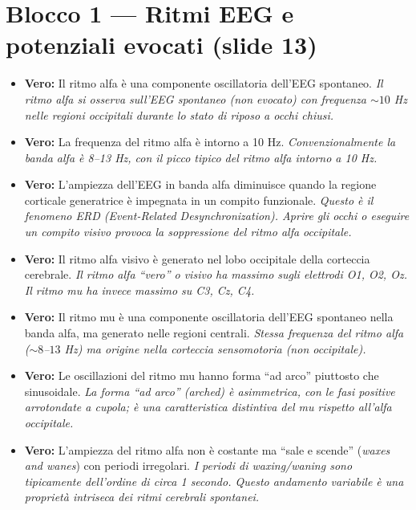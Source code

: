 \section{Blocco 1 — Ritmi EEG e potenziali evocati (slide 13)}

\begin{itemize}
    \item \textbf{Vero:} Il ritmo alfa è una componente oscillatoria dell'EEG spontaneo.
    \textit{Il ritmo alfa si osserva sull'EEG spontaneo (non evocato) con frequenza $\sim 10$ Hz nelle regioni occipitali durante lo stato di riposo a occhi chiusi.}
    
    \item \textbf{Vero:} La frequenza del ritmo alfa è intorno a 10 Hz.
    \textit{Convenzionalmente la banda alfa è 8--13 Hz, con il picco tipico del ritmo alfa intorno a 10 Hz.}
    
    \item \textbf{Vero:} L'ampiezza dell'EEG in banda alfa diminuisce quando la regione corticale generatrice è impegnata in un compito funzionale.
    \textit{Questo è il fenomeno ERD (Event-Related Desynchronization). Aprire gli occhi o eseguire un compito visivo provoca la soppressione del ritmo alfa occipitale.}
    
    \item \textbf{Vero:} Il ritmo alfa visivo è generato nel lobo occipitale della corteccia cerebrale.
    \textit{Il ritmo alfa ``vero'' o visivo ha massimo sugli elettrodi O1, O2, Oz. Il ritmo mu ha invece massimo su C3, Cz, C4.}
    
    \item \textbf{Vero:} Il ritmo mu è una componente oscillatoria dell'EEG spontaneo nella banda alfa, ma generato nelle regioni centrali.
    \textit{Stessa frequenza del ritmo alfa ($\sim 8$--$13$ Hz) ma origine nella corteccia sensomotoria (non occipitale).}
    
    \item \textbf{Vero:} Le oscillazioni del ritmo mu hanno forma ``ad arco'' piuttosto che sinusoidale.
    \textit{La forma ``ad arco'' (arched) è asimmetrica, con le fasi positive arrotondate a cupola; è una caratteristica distintiva del mu rispetto all'alfa occipitale.}
    
    \item \textbf{Vero:} L'ampiezza del ritmo alfa non è costante ma ``sale e scende'' (\textit{waxes and wanes}) con periodi irregolari.
    \textit{I periodi di waxing/waning sono tipicamente dell'ordine di circa 1 secondo. Questo andamento variabile è una proprietà intriseca dei ritmi cerebrali spontanei.}
    

\end{itemize}
